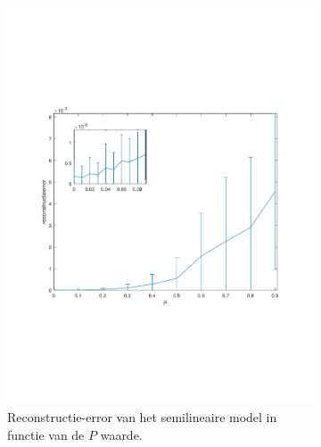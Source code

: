 \documentclass[12pt]{report}
\begin{document}
\begin{figure}

\begin{subfigure}[b]{0.5\textwidth}
\includegraphics[width=\textwidth,trim=0 200 0 175 cm]{PMC_10_100_E.pdf}
\caption{Reconstructie-error van het semilineaire model in functie van de $P$ waarde. \label{fig:E}}
\end{subfigure}
\begin{subfigure}[b]{0.5\textwidth}

\end{subfigure}
\end{figure}
\end{document}
